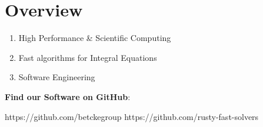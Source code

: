 \section{Overview}

\begin{frame}
            
    \begin{enumerate}
        \item High Performance \& Scientific Computing
        \item Fast algorithms for Integral Equations
        \item Software Engineering
    \end{enumerate}
    
    

    \textbf{Find our Software on GitHub}:

    https://github.com/betckegroup
    https://github.com/rusty-fast-solvers
\end{frame}
